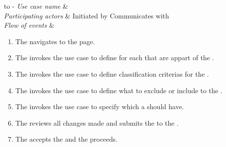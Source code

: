 %
%
\begin{table}[H]
\tabulinesep =1.5mm
\begin{tabu} to 
	\tabucline[1.5pt]-
	\textit{Use case name} & \manageStudy \\
	\hline
	\textit{Participating actors} & Initiated by \client \newline Communicates with \serverside \\
	\hline
	\textit{Flow of events} &
	\vspace{-3mm}

\begin{enumerate}[leftmargin=*,topsep=0pt,itemsep=-1ex]
	\item The \client navigates to the \serverside page.\\
	\item The \client invokes the \manageRole use case to define \role for each \user that are appart of the \studycon.\\
	\item The \client invokes the \manageClassCrit use case to define classification criterias for the \studycon.\\
	\item The \client invokes the \manageInExCrit use case to define  what to exclude or include to the \studycon.\\
	\item The \client  invokes the \manageTask use case to specify which \task a \user should have.\\
	\item The \client reviews all changes made and submits the \studycon to the \serverside.	
			
				\setlength{\itemindent}{2cm}
				\item \parbox[t]{\linewidth-\itemindent}{The \serverside accepts the \user and the \request proceeds.}
		

\end{enumerate}
\end{tabu}
\end{table}
